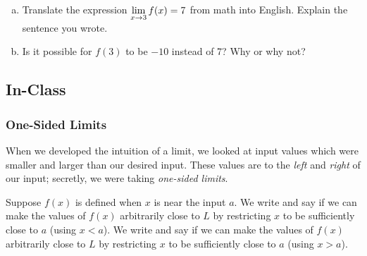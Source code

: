 \documentclass[notes]{subfiles}
\begin{document}
		\begin{ex}
			\begin{enumerate}[(a)]
				\item Translate the expression $\displaystyle \lim_{x\to 3} f(x) = 7$ from math into English.  Explain the sentence you wrote. 
				\item Is it possible for $f(3)$ to be $-10$ instead of 7?  Why or why not?
			\end{enumerate}
		\end{ex}
			\newpage

	\subsection*{In-Class}
	\subsubsection*{One-Sided Limits}
		When we developed the intuition of a limit, we looked at input values which were smaller and larger than our desired input.  These values are to the \emph{left} and \emph{right} of our input; secretly, we were taking \emph{one-sided limits}.
		\begin{defn}
			Suppose $f(x)$ is defined when $x$ is near the input $a$.  We write
			and say
			if we can make the values of $f(x)$ arbitrarily close to $L$ by restricting $x$ to be sufficiently close to $a$ (using $x < a$).  We write
			and say
			if we can make the values of $f(x)$ arbitrarily close to $L$ by restricting $x$ to be sufficiently close to $a$ (using $x > a$).
		\end{defn}
\end{document}
